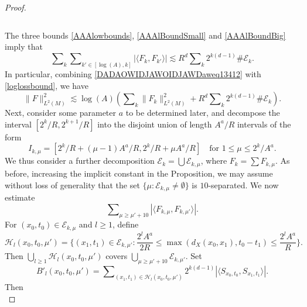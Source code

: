 \begin{proof}
\begin{itemize}
\begin{equation}
    \end{equation}
\end{itemize}
%
The three bounds \eqref{AAAlowbounds}, \eqref{AAAlBoundSmall} and \eqref{AAAlBoundBig} imply that
%
\begin{equation} \label{DADAOWIDJAWOIDJAWDaweq13412}
    \sum\nolimits_k \sum\nolimits_{k' \in [\log(A), k]} |\langle F_k, F_{k'} \rangle| \lesssim R^d \sum\nolimits_k 2^{k (d-1)} \# \mathcal{E}_k.
\end{equation}
%
In particular, combining \eqref{DADAOWIDJAWOIDJAWDaweq13412} with \eqref{loglossbound}, we have
%
\begin{equation} \label{DPOWADPAWKDPOWAKDOPWAK}
    \| F \|_{L^2(M)}^2 \lesssim \log(A) \left( \sum\nolimits_k \| F_k \|_{L^2(M)}^2 + R^d \sum\nolimits_k 2^{k (d-1)} \# \mathcal{E}_k \right).
\end{equation}
%
Next, consider some parameter $a$ to be determined later, and decompose the interval $[2^{k} / R, 2^{k+1} / R]$ into the disjoint union of length $A^a / R$ intervals of the form
%
\begin{equation}
    I_{k,\mu} = [ 2^{k} / R + (\mu - 1) A^a / R, 2^{k} / R + \mu A^a / R] \quad\text{for $1 \leq \mu \leq 2^k/A^a$}.
\end{equation}
%
We thus consider a further decomposition $\mathcal{E}_k = \bigcup \mathcal{E}_{k,\mu}$, where $F_k = \sum F_{k,\mu}$. As before, increasing the implicit constant in the Proposition, we may assume without loss of generality that the set $\{ \mu: \mathcal{E}_{k,\mu} \neq \emptyset \}$ is $10$-separated. We now estimate
%
\begin{equation}
    \sum\nolimits_{\mu \geq \mu' + 10} |\langle F_{k,\mu}, F_{k,\mu'} \rangle|.
\end{equation}
%
For $(x_0,t_0) \in \mathcal{E}_{k,\mu}$ and $l \geq 1$, define
%
\begin{equation}
    \mathcal{H}_l(x_0,t_0,\mu') = \Big\{ (x_1,t_1) \in \mathcal{E}_{k,\mu'} : \frac{2^l A^a}{2R} \leq \max(d_X(x_0,x_1), t_0 - t_1) \leq \frac{2^l A^a}{R} \Big\}.
\end{equation}
%
Then $\bigcup_{l \geq 1} \mathcal{H}_l(x_0,t_0,\mu')$ covers $\bigcup_{\mu \geq \mu' + 10} \mathcal{E}_{k,\mu'}$. Set
%
\begin{equation}
    B'_l(x_0,t_0,\mu') = \sum\nolimits_{(x_1,t_1) \in \mathcal{H}_l(x_0,t_0,\mu')} 2^{k(d-1)} |\langle {S\!}_{x_0,t_0}, {S\!}_{x_1,t_1} \rangle|.
\end{equation}
%
Then
%
\begin{equation}

\end{equation}
\end{proof}
